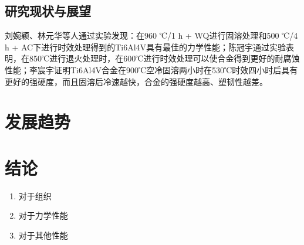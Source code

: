 \documentclass[
class = book,
zihao = -4,
font = noto,
paper = a4paper,
openany
]{easybook}
\newcommand{\ti}{Ti6Al4V}
\begin{document}
\section{研究现状与展望}
 刘婉颖、林元华等人通过实验发现：在960 ℃/1 h + WQ进行固溶处理和500 ℃/4 h + AC下进行时效处理得到的\ti 具有最佳的力学性能\cite{960500}；陈冠宇通过实验表明，在850℃进行退火处理时，在600℃进行时效处理可以使合金得到更好的耐腐蚀性能\cite{1200}；李宸宇证明\ti 合金在900℃空冷固溶两小时在530℃时效四小时后具有更好的强硬度，而且固溶后冷速越快，合金的强硬度越高、塑韧性越差\cite{900}。%

\chapter{发展趋势}

\chapter{结论}
	\begin{enumerate}
		\item 对于组织
		\item 对于力学性能
		\item 对于其他性能
	\end{enumerate}


	\backmatter
	\listoffigures
	\listoftables
	\clearpage
	
\end{document}
